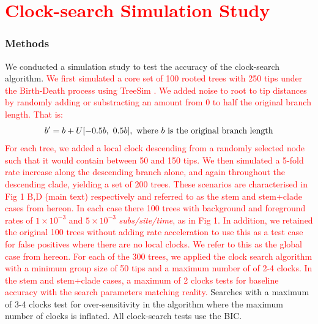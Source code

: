 \documentclass{article}
\begin{document}
\section{\textcolor{red}{Clock-search Simulation Study}}
\subsubsection*{Methods}
We conducted a simulation study to test the accuracy of the clock-search algorithm. \textcolor{red}{We first simulated a core set of 100 rooted trees with 250 tips under the Birth-Death process using TreeSim \citep{stadler_2011_simulating}. We added noise to root to tip distances by randomly adding or substracting an amount from 0 to half the original branch length. That is:
\begin{equation*}
    b^{\prime}= b + U[-0.5b,~0.5b],~\textnormal{where $b$ is the original branch length}
\end{equation*}
For each tree, we added a local clock descending from a randomly selected node such that it would contain between 50 and 150 tips. We then simulated a 5-fold rate increase along the descending branch alone, and again throughout the descending clade, yielding a set of 200 trees. These scenarios are characterised in Fig 1 B,D (main text) respectively and referred to as the stem and stem+clade cases from hereon. In each case there 100 trees with background and foreground rates of $1\times10^{-3}$ and $5\times10^{-3}$ \textit{subs/site/time}, as in Fig 1. In addition, we retained the original 100 trees without adding rate acceleration to use this as a test case for false positives where there are no local clocks. We refer to this as the global case  from hereon. For each of the 300 trees, we applied the clock search algorithm with a minimum group size of 50 tips and a maximum number of of 2-4 clocks. In the stem and stem+clade cases, a maximum of 2 clocks tests for baseline accuracy with the search parameters matching reality.} Searches with a maximum of 3-4 clocks test for over-sensitivity in the algorithm where the maximum number of clocks is inflated. All clock-search tests use the BIC.
\end{document}
